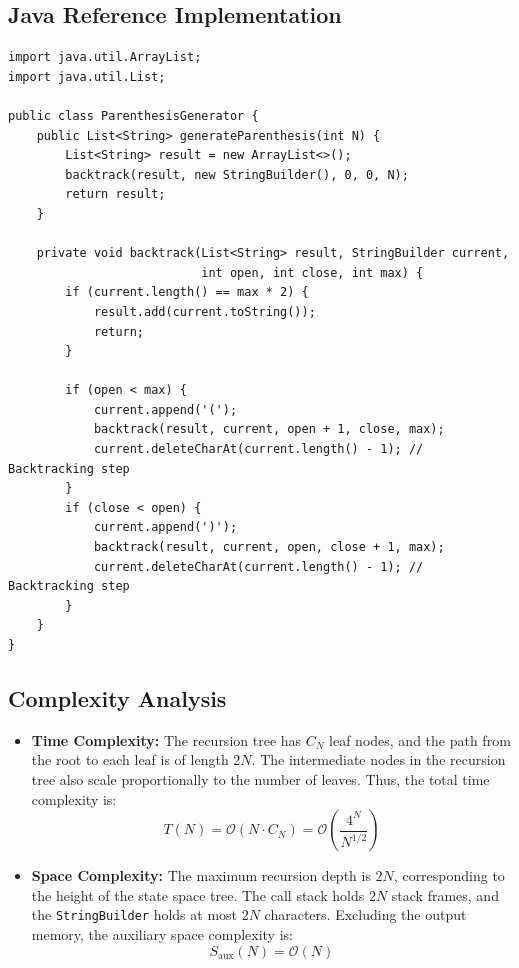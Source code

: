 \documentclass[10pt,journal,compsoc,onecolumn]{IEEEtran}
\begin{document}
\subsection{Java Reference Implementation}
\begin{verbatim}
import java.util.ArrayList;
import java.util.List;

public class ParenthesisGenerator {
    public List<String> generateParenthesis(int N) {
        List<String> result = new ArrayList<>();
        backtrack(result, new StringBuilder(), 0, 0, N);
        return result;
    }

    private void backtrack(List<String> result, StringBuilder current, 
                           int open, int close, int max) {
        if (current.length() == max * 2) {
            result.add(current.toString());
            return;
        }

        if (open < max) {
            current.append('(');
            backtrack(result, current, open + 1, close, max);
            current.deleteCharAt(current.length() - 1); // Backtracking step
        }
        if (close < open) {
            current.append(')');
            backtrack(result, current, open, close + 1, max);
            current.deleteCharAt(current.length() - 1); // Backtracking step
        }
    }
}
\end{verbatim}

\subsection{Complexity Analysis}
\begin{itemize}
    \item \textbf{Time Complexity:} The recursion tree has $C_N$ leaf nodes, and the path from the root to each leaf is of length $2N$. The intermediate nodes in the recursion tree also scale proportionally to the number of leaves. Thus, the total time complexity is:
    \begin{equation}
    T(N) = \mathcal{O}(N \cdot C_N) = \mathcal{O}\left( \frac{4^N}{N^{1/2}} \right)
    \end{equation}
    \item \textbf{Space Complexity:} The maximum recursion depth is $2N$, corresponding to the height of the state space tree. The call stack holds $2N$ stack frames, and the \texttt{StringBuilder} holds at most $2N$ characters. Excluding the output memory, the auxiliary space complexity is:
    \begin{equation}
    S_{\text{aux}}(N) = \mathcal{O}(N)
    \end{equation}
\end{itemize}
\end{document}
